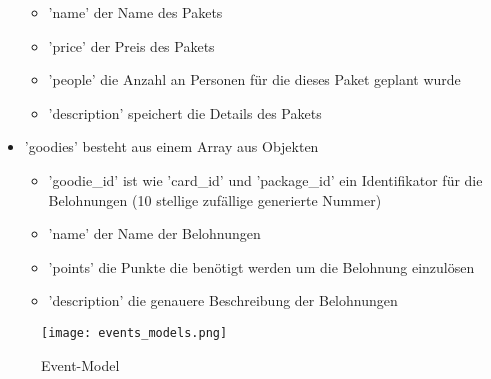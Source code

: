 \begin{itemize}
\begin{itemize}
						\item 'name' der Name des Pakets
						\item 'price' der Preis des Pakets
						\item 'people' die Anzahl an Personen für die dieses Paket geplant wurde
						\item 'description' speichert die Details des Pakets
					\end{itemize}
					\item 'goodies' besteht aus einem Array aus Objekten
					\begin{itemize}
						\item 'goodie\_id' ist wie 'card\_id' und 'package\_id' ein Identifikator für die Belohnungen (10 stellige zufällige generierte Nummer)
						\item 'name' der Name der Belohnungen
						\item 'points' die Punkte die benötigt werden um die Belohnung einzulösen
						\item 'description' die genauere Beschreibung der Belohnungen
					\end{itemize}				
				\end{itemize}
			
			\begin{figure}[H]
				\centering
				\texttt{[image: events\_models.png]}
				\caption{Event-Model}
			\end{figure}	
			
			\newpage		
				
